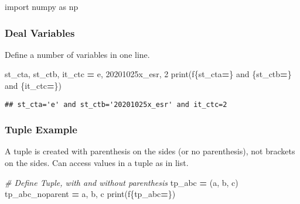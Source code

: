 \documentclass[
]{book}
\newenvironment{Shaded}{\begin{snugshade}}{\end{snugshade}}
\newcommand{\BuiltInTok}[1]{#1}
\newcommand{\CommentTok}[1]{\textcolor[rgb]{0.56,0.35,0.01}{\textit{#1}}}
\newcommand{\DecValTok}[1]{\textcolor[rgb]{0.00,0.00,0.81}{#1}}
\newcommand{\ImportTok}[1]{#1}
\newcommand{\NormalTok}[1]{#1}
\newcommand{\OperatorTok}[1]{\textcolor[rgb]{0.81,0.36,0.00}{\textbf{#1}}}
\newcommand{\SpecialCharTok}[1]{\textcolor[rgb]{0.00,0.00,0.00}{#1}}
\newcommand{\SpecialStringTok}[1]{\textcolor[rgb]{0.31,0.60,0.02}{#1}}
\newcommand{\StringTok}[1]{\textcolor[rgb]{0.31,0.60,0.02}{#1}}
\begin{document}
\begin{Shaded}
\begin{Highlighting}[]
\ImportTok{import}\NormalTok{ numpy }\ImportTok{as}\NormalTok{ np}
\end{Highlighting}
\end{Shaded}

\hypertarget{deal-variables}{%
\subsubsection{Deal Variables}\label{deal-variables}}

Define a number of variables in one line.

\begin{Shaded}
\begin{Highlighting}[]
\NormalTok{st\_cta, st\_ctb, it\_ctc }\OperatorTok{=} \StringTok{\textquotesingle{}e\textquotesingle{}}\NormalTok{, }\StringTok{\textquotesingle{}20201025x\_esr\textquotesingle{}}\NormalTok{, }\DecValTok{2}
\BuiltInTok{print}\NormalTok{(}\SpecialStringTok{f\textquotesingle{}}\SpecialCharTok{\{}\NormalTok{st\_cta}\OperatorTok{=}\SpecialCharTok{\}}\SpecialStringTok{ and }\SpecialCharTok{\{}\NormalTok{st\_ctb}\OperatorTok{=}\SpecialCharTok{\}}\SpecialStringTok{ and }\SpecialCharTok{\{}\NormalTok{it\_ctc}\OperatorTok{=}\SpecialCharTok{\}}\SpecialStringTok{\textquotesingle{}}\NormalTok{)}
\end{Highlighting}
\end{Shaded}

\begin{verbatim}
## st_cta='e' and st_ctb='20201025x_esr' and it_ctc=2
\end{verbatim}

\hypertarget{tuple-example}{%
\subsubsection{Tuple Example}\label{tuple-example}}

A tuple is created with parenthesis on the sides (or no parenthesis), not brackets on the sides. Can access values in a tuple as in list.

\begin{Shaded}
\begin{Highlighting}[]
\CommentTok{\# Define Tuple, with and without parenthesis}
\NormalTok{tp\_abc }\OperatorTok{=}\NormalTok{ (}\StringTok{\textquotesingle{}a\textquotesingle{}}\NormalTok{, }\StringTok{\textquotesingle{}b\textquotesingle{}}\NormalTok{, }\StringTok{\textquotesingle{}c\textquotesingle{}}\NormalTok{)}
\NormalTok{tp\_abc\_noparent }\OperatorTok{=} \StringTok{\textquotesingle{}a\textquotesingle{}}\NormalTok{, }\StringTok{\textquotesingle{}b\textquotesingle{}}\NormalTok{, }\StringTok{\textquotesingle{}c\textquotesingle{}}
\BuiltInTok{print}\NormalTok{(}\SpecialStringTok{f\textquotesingle{}}\SpecialCharTok{\{}\NormalTok{tp\_abc}\OperatorTok{=}\SpecialCharTok{\}}\SpecialStringTok{\textquotesingle{}}\NormalTok{)}
\end{Highlighting}
\end{Shaded}
\end{document}
